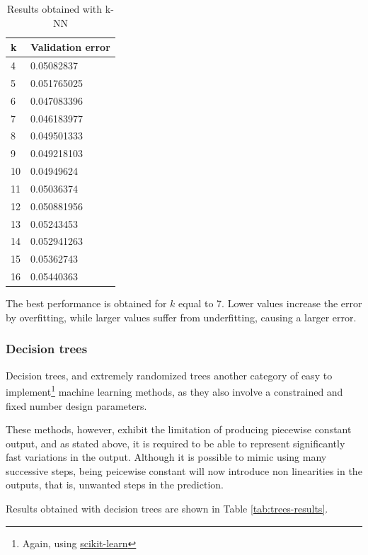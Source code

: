 \begin{table}[h]
    \centering
    \begin{tabular}{|l|l|}
        \hline
        k & Validation error \\ \hline
        4  & 0.05082837 \\
        5  & 0.051765025 \\
        6  & 0.047083396 \\
        7  & 0.046183977 \\
        8  & 0.049501333 \\
        9  & 0.049218103 \\
        10 & 0.04949624 \\
        11 & 0.05036374 \\
        12 & 0.050881956 \\
        13 & 0.05243453 \\
        14 & 0.052941263 \\
        15 & 0.05362743 \\
        16 & 0.05440363 \\ \hline
    \end{tabular}
    \caption{Results obtained with k-NN}
    \label{tab:results-knn}
\end{table}

The best performance is obtained for $k$ equal to 7. Lower values increase the error by overfitting, while larger values suffer from underfitting, causing a larger error.

\subsubsection{Decision trees}

Decision trees, and extremely randomized trees \cite{extremely-randomized-trees} another category of easy to implement\footnote{Again, using \href{https://scikit-learn.org/stable/modules/ensemble.html\#forests-of-randomized-trees}{scikit-learn}} machine learning methods, as they also involve a constrained and fixed number design parameters.

 These methods, however, exhibit the limitation of producing piecewise constant output, and as stated above, it is required to be able to represent significantly fast variations in the output. Although it is possible to mimic using many successive steps, being peicewise constant will now introduce non linearities in the outputs, that is, unwanted steps in the prediction.

Results obtained with decision trees are shown in Table \ref{tab:trees-results}.

